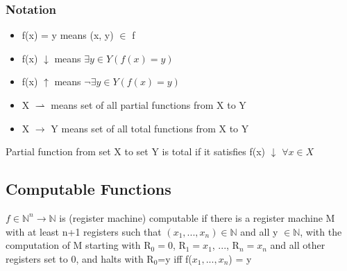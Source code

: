 \documentclass{article}
\begin{document}
\subsubsection{Notation}
\begin{itemize}
    \item f(x) = y means (x, y) $\in$ f
    \item f(x) $\downarrow$ means $\exists y \in Y(f(x) = y)$
    \item f(x) $\uparrow$ means $\neg \exists y \in Y(f(x) = y)$
    \item X $\rightharpoonup$ means set of all partial functions from X to Y
    \item X $\rightarrow$ Y means set of all total functions from X to Y
\end{itemize}

\bigskip
\noindent
Partial function from set X to set Y is total if it satisfies f(x) $\downarrow$ $\forall x \in X$

\subsection{Computable Functions}
$f \in \mathbb{N}^{n} \rightarrow \mathbb{N}$ is (register machine) computable if there is a register machine M with at least n+1 registers such that $(x_{1}, ..., x_{n}) \in \mathbb{N}$ and all y $\in \mathbb{N}$, with the computation of M starting with R$_{0}=0$, R$_{1} = x_{1}$, ..., R$_{n} = x_{n}$ and all other registers set to 0, and halts with R$_{0}$=y iff f($x_{1}, ..., x_{n}$) = y
\end{document}

